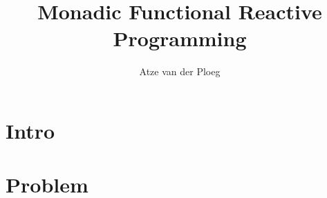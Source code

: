 \documentclass{beamer}
\title{Monadic Functional Reactive Programming}
\author{Atze van der Ploeg}
\institute{
Centrum Wiskunde \& Informatica, Amsterdam, The Netherlands}
\begin{document}



\begin{frame}[plain]
\begin{center}
  \scalebox{12}{$\bind$}
\end{center}
\vspace{-0.5cm}
  \titlepage
\end{frame}

\section{Intro}



\newcommand{\inlineitem}{%
{\color{navyblue} \leavevmode\usebeamertemplate{itemize item} }
}



\section{Problem}
\end{document}
